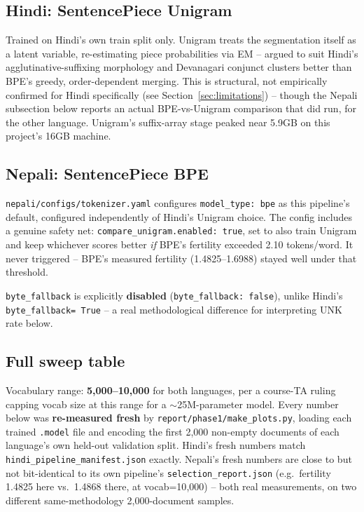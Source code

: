 \documentclass[11pt]{article}
\begin{document}
\subsection{Hindi: SentencePiece Unigram}

Trained on Hindi's own train split only. Unigram treats the segmentation
itself as a latent variable, re-estimating piece probabilities via EM --
argued to suit Hindi's agglutinative-suffixing morphology and Devanagari
conjunct clusters better than BPE's greedy, order-dependent merging. This
is structural, not empirically confirmed for Hindi specifically (see
Section~\ref{sec:limitations}) -- though the Nepali subsection below
reports an actual BPE-vs-Unigram comparison that did run, for the other
language. Unigram's suffix-array stage peaked near 5.9GB on this
project's 16GB machine.

\subsection{Nepali: SentencePiece BPE}

\texttt{nepali/configs/tokenizer.yaml} configures \texttt{model\_type:
bpe} as this pipeline's default, configured independently of Hindi's
Unigram choice. The config includes a genuine safety net:
\texttt{compare\_unigram.enabled: true}, set to also train Unigram and
keep whichever scores better \textit{if} BPE's fertility exceeded 2.10
tokens/word. It never triggered -- BPE's measured fertility
(1.4825--1.6988) stayed well under that threshold.

\texttt{byte\_fallback} is explicitly \textbf{disabled}
(\texttt{byte\_fallback: false}), unlike Hindi's \texttt{byte\_fallback=
True} -- a real methodological difference for interpreting UNK rate
below.

\subsection{Full sweep table}

Vocabulary range: \textbf{5{,}000--10{,}000} for both languages, per a
course-TA ruling capping vocab size at this range for a
$\sim$25M-parameter model. Every number below was \textbf{re-measured
fresh} by \texttt{report/phase1/make\_plots.py}, loading each trained
\texttt{.model} file and encoding the first 2{,}000 non-empty documents
of each language's own held-out validation split. Hindi's fresh numbers
match \texttt{hindi\_pipeline\_manifest.json} exactly. Nepali's fresh
numbers are close to but not bit-identical to its own pipeline's
\texttt{selection\_report.json} (e.g.\ fertility 1.4825 here vs.\ 1.4868
there, at vocab=10{,}000) -- both real measurements, on two different
same-methodology 2{,}000-document samples.
\end{document}
